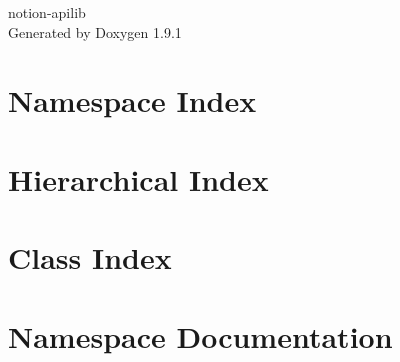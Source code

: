 \let\mypdfximage\pdfximage\def\pdfximage{\immediate\mypdfximage}\documentclass[twoside]{book}
\newcommand{\+}{\discretionary{\mbox{\scriptsize$\hookleftarrow$}}{}{}}
\newcommand{\clearemptydoublepage}{%
  \newpage{\pagestyle{empty}\cleardoublepage}%
}
\begin{document}
\raggedbottom

\hypersetup{pageanchor=false,
             bookmarksnumbered=true,
             pdfencoding=unicode
            }
\begin{titlepage}
\vspace*{7cm}
\begin{center}%
{\Large notion-\/apilib }\\
\vspace*{1cm}
{\large Generated by Doxygen 1.9.1}\\
\end{center}
\end{titlepage}
\clearemptydoublepage
{}
\tableofcontents
\clearemptydoublepage
{}
\hypersetup{pageanchor=true}

\chapter{Namespace Index}

\chapter{Hierarchical Index}

\chapter{Class Index}

\chapter{Namespace Documentation}




















\end{document}
